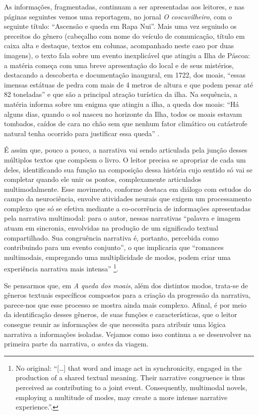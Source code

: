 \documentclass[portuguese]{textolivre}
\begin{document}
As informações, fragmentadas, continuam a ser apresentadas aos leitores, e nas
páginas seguintes vemos uma reportagem, no jornal \textit{O coscuvilheiro}, com
o seguinte título: “Ascensão e queda em Rapa Nui”. Mais uma vez seguindo os
preceitos do gênero (cabeçalho com nome do veículo de comunicação, título em
caixa alta e destaque, textos em colunas, acompanhado neste caso por duas
imagens), o texto fala sobre um evento inexplicável que atingiu a Ilha de
Páscoa: a matéria começa com uma breve apresentação do local e de seus
mistérios, destacando a descoberta e documentação inaugural, em 1722, dos
moais, “essas imensas estátuas de pedra com mais de 4 metros de altura e que
podem pesar até 82 toneladas” e que são a principal atração turística da ilha.
Na sequência, a matéria informa sobre um enigma que atingiu a ilha, a queda dos
moais: “Há alguns dias, quando o sol nasceu no horizonte da Ilha, todos os
moais estavam tombados, caídos de cara no chão sem que nenhum fator climático
ou catástrofe natural tenha ocorrido para justificar essa queda”
\cite[p.~10-11]{franco_queda_2018}.

É assim que, pouco a pouco, a narrativa vai sendo articulada pela junção desses
múltiplos textos que compõem o livro. O leitor precisa se apropriar de cada um
deles, identificando sua função na composição dessa história cujo sentido só
vai se completar quando ele unir os pontos, complexamente articulados
multimodalmente. Esse movimento, conforme destaca \textcite{gibbons_i_2010} em
diálogo com estudos do campo da neurociência, envolve atividades neurais que
exigem um processamento complexo que só se efetiva mediante a co-ocorrência de
informações apresentadas pela narrativa multimodal: para o autor, nessas
narrativas “palavra e imagem atuam em sincronia, envolvidas na produção de um
significado textual compartilhado. Sua congruência narrativa é, portanto,
percebida como contribuindo para um evento conjunto”, o que implicaria que
“romances multimodais, empregando uma multiplicidade de modos, podem criar uma
experiência narrativa mais intensa” \cite[p.~101]{gibbons_i_2010}\footnote{No
original: “[…] that word and image act in synchronicity, engaged in the
production of a shared textual meaning. Their narrative congruence is thus
perceived as contributing to a joint event. Consequently, multimodal novels,
employing a multitude of modes, may create a more intense narrative
experience.”.}.

Se pensarmos que, em \textit{A queda dos moais}, além dos distintos modos,
trata-se de gêneros textuais específicos compostos para a criação da progressão
da narrativa, parece-nos que esse processo se mostra ainda mais complexo.
Afinal, é por meio da identificação desses gêneros, de suas funções e
características, que o leitor consegue reunir as informações de que necessita
para atribuir uma lógica narrativa a informações isoladas. Vejamos como isso
continua a se desenvolver na primeira parte da narrativa, o \textit{antes} da
viagem.
\end{document}
